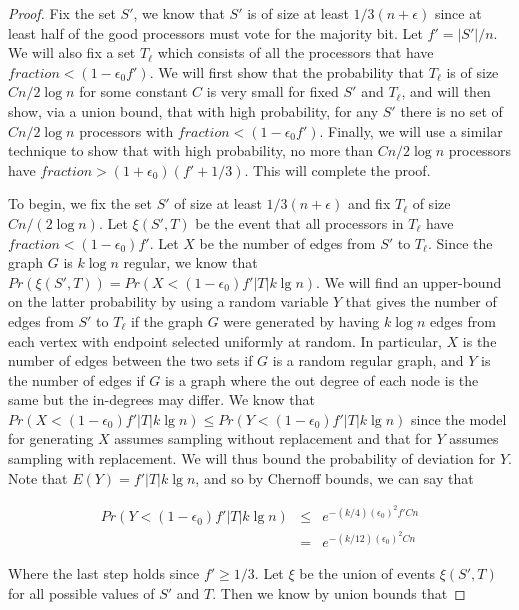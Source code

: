 \documentclass{sig-alternate}
\begin{document}
\begin{proof}
Fix the set $S'$, we know that $S'$ is of size at least $1/3(n + \epsilon)$ since at least half of the good processors must vote for the majority bit.  Let $f' = |S'|/n$. We will also fix a set $T_{\ell}$ which consists of all the processors that have $fraction < (1-\epsilon_{0} f')$.  We will first show that the probability that $T_{\ell}$ is of size $C n/ 2\log n$ for some constant $C$ is very small for fixed $S'$ and $T_{\ell}$, and will then show, via a union bound, that with high probability, for any $S'$ there is no set of $C n/ 2\log n$ processors with $fraction < (1-\epsilon_{0} f')$.  Finally, we will use a similar technique to show that with high probability, no more than $C n/ 2\log n$ processors have $fraction > (1+\epsilon_{0}) (f' + 1/3)$.  This will complete the proof.

To begin, we fix the set $S'$ of size at least $1/3(n + \epsilon)$ and fix $T_{\ell}$ of size $C n/ (2\log n)$.  Let $\xi(S',T)$ be the event that all processors in $T_{\ell}$ have $fraction < (1-\epsilon_{0}) f'$.  Let $X$ be the number of edges from $S'$ to $T_{\ell}$.  Since the graph $G$ is $k \log n$ regular, we know that $Pr(\xi(S',T)) = Pr(X < (1-\epsilon_{0}) f' |T| k \lg n)$.  We will find an upper-bound on the latter probability by using a random variable $Y$ that gives the number of edges from $S'$ to $T_{\ell}$ if the graph $G$ were generated by having $k \log n$ edges from each vertex with endpoint selected uniformly at random.  In particular, $X$ is the number of edges between the two sets if $G$ is a random regular graph, and $Y$ is the number of edges if $G$ is a graph where the out degree of each node is the same but the in-degrees may differ.  We know that $Pr(X < (1-\epsilon_{0}) f' |T| k \lg n) \leq Pr(Y < (1-\epsilon_{0}) f' |T| k \lg n)$ since the model for generating $X$ assumes sampling without replacement and that for $Y$ assumes sampling with replacement.  We will thus bound the probability of deviation for $Y$.  Note that $E(Y) = f' |T| k \lg n$, and so by Chernoff bounds, we can say that 

\begin{eqnarray*}
Pr (Y < (1-\epsilon_{0}) f' |T| k \lg n) & \leq & e^{-(k/4)(\epsilon_{0})^{2} f' C n} \\
& = & e^{-(k/12)(\epsilon_{0})^{2} C n}
\end{eqnarray*}

Where the last step holds since $f' \geq 1/3$.  Let $\xi$ be the union of events $\xi(S',T)$ for all possible values of $S'$ and $T$.  Then we know by union bounds that


\end{proof}
\end{document}
